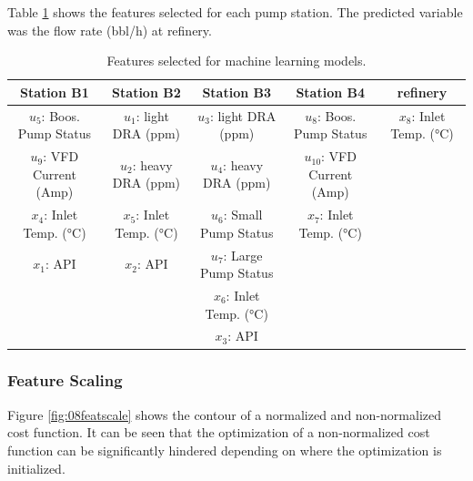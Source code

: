 Table \ref{tab:08featselect} shows the features selected for each pump station. The predicted variable was the flow rate (bbl/h) at refinery.
\begin{table}[h]
    \centering
    {\tiny
    {
    \begin{tabular}{ c | c | c | c | c}
        Station B1                       & Station B2                      & Station B3                        & Station B4                    & refinery \\
        \hline
        $u_5$: Boos. Pump Status       &  $u_1$: light DRA (ppm)  &  $u_3$: light DRA (ppm)     &  $u_{8}$: Boos. Pump Status   &  $x_{8}$: Inlet Temp. (°C) \\
        
        $u_9$: VFD Current (Amp)       &  $u_2$: heavy DRA (ppm)   &  $u_4$: heavy DRA (ppm)      & $u_{10}$: VFD Current (Amp)      & \\
        
        $x_{4}$: Inlet Temp. (°C)     &  $x_{5}$: Inlet Temp. (°C) &  $u_6$: Small Pump Status &  $x_{7}$: Inlet Temp. (°C)  & \\
        
        $x_{1}$: API                   &  $x_{2}$: API          &  $u_7$: Large Pump Status   &             
        & \\
        
                                       &                          &  $x_{6}$: Inlet Temp. (°C)  &             
        & \\
        
                                       &                          &  $x_{3}$: API               &       
        & \\
        
    \end{tabular}}}
    \caption{Features selected for machine learning models.}
    \label{tab:08featselect}
\end{table}

\subsubsection{Feature Scaling}
Figure \ref{fig:08featscale} shows the contour of a normalized and non-normalized cost function. It can be seen that the optimization of a non-normalized cost function can be significantly hindered depending on where the optimization is initialized.

